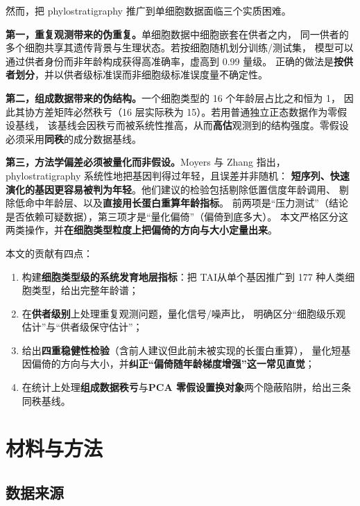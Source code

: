 \documentclass[UTF8, a4paper, 11pt]{ctexart}
\newcommand{\tai}{\textsc{TAI}}
\begin{document}
然而，把 phylostratigraphy 推广到单细胞数据面临三个实质困难。

\textbf{第一，重复观测带来的伪重复。}单细胞数据中细胞嵌套在供者之内，
同一供者的多个细胞共享其遗传背景与生理状态。若按细胞随机划分训练/测试集，
模型可以通过供者身份而非年龄构成获得高准确率，虚高到 0.99 量级。
正确的做法是\textbf{按供者划分}，并以供者级标准误而非细胞级标准误度量不确定性\citep{hafemeister2019}。

\textbf{第二，组成数据带来的伪结构。}一个细胞类型的 16 个年龄层占比之和恒为 1，
因此其协方差矩阵必然秩亏（16 层实际秩为 15）。若用普通独立正态数据作为零假设基线，
该基线会因秩亏而被系统性推高，从而\textbf{高估}观测到的结构强度。零假设必须采用\textbf{同秩}的成分数据基线。

\textbf{第三，方法学偏差必须被量化而非假设。}Moyers 与 Zhang\citep{moyers2015,moyers2017,moyers2018}
指出，phylostratigraphy 系统性地把基因判得过年轻，且误差并非随机：
\textbf{短序列、快速演化的基因更容易被判为年轻}。他们建议的检验包括剔除低置信度年龄调用、
剔除低命中年龄层、以及\textbf{直接用长蛋白重算年龄指标}。
前两项是“压力测试”（结论是否依赖可疑数据），第三项才是“量化偏倚”（偏倚到底多大）。
本文严格区分这两类操作，并\textbf{在细胞类型粒度上把偏倚的方向与大小定量出来}。

本文的贡献有四点：
\begin{enumerate}[label=(\arabic*)]
  \item 构建\textbf{细胞类型级的系统发育地层指标}：把 \tai 从单个基因推广到 177 种人类细胞类型，给出完整年龄谱；
  \item 在\textbf{供者级别}上处理重复观测问题，量化信号/噪声比，
        明确区分“细胞级乐观估计”与“供者级保守估计”；
  \item 给出\textbf{四重稳健性检验}（含前人建议但此前未被实现的长蛋白重算），
        量化短基因偏倚的方向与大小，并\textbf{纠正“偏倚随年龄梯度增强”这一常见直觉}；
  \item 在统计上处理\textbf{组成数据秩亏}与\textbf{PCA 零假设置换对象}两个隐蔽陷阱，给出三条同秩基线。
\end{enumerate}

\section{材料与方法}

\subsection{数据来源}
\end{document}

